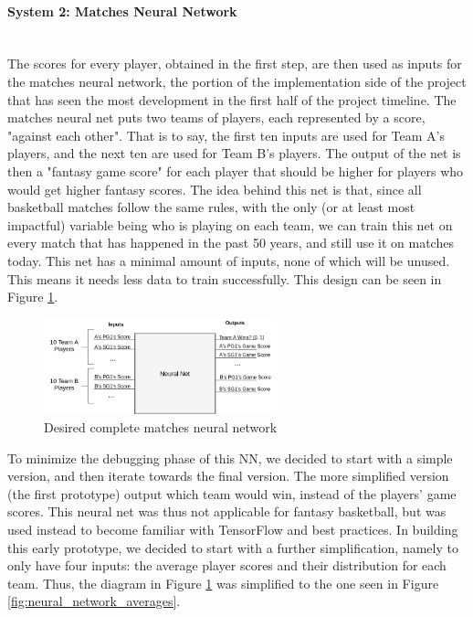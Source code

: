 \paragraph{System 2: Matches Neural Network}\mbox{}\\
The scores for every player, obtained in the first step, are then used as inputs for the matches neural network, the portion of the implementation side of the project that has seen the most development in the first half of the project timeline. The matches neural net puts two teams of players, each represented by a score, "against each other". That is to say, the first ten inputs are used for Team A's players, and the next ten are used for Team B's players.  The output of the net is then a "fantasy game score" for each player that should be higher for players who would get higher fantasy scores. The idea behind this net is that, since all basketball matches follow the same rules, with the only (or at least most impactful) variable being who is playing on each team, we can train this net on every match that has happened in the past 50 years, and still use it on matches today. This net has a minimal amount of inputs, none of which will be unused. This means it needs less data to train successfully. This design can be seen in Figure \ref{fig:neural_network_full}.

\begin{figure}[ht]
    \centering
    \includegraphics[width=0.6\textwidth]{figures/neural_network_full}
    \caption{Desired complete matches neural network}
    \label{fig:neural_network_full}
\end{figure}

To minimize the debugging phase of this NN, we decided to start with a simple version, and then iterate towards the final version. The more simplified version (the first prototype) output which team would win, instead of the players' game scores. This neural net was thus not applicable for fantasy basketball, but was used instead to become familiar with TensorFlow and best practices. In building this early prototype, we decided to start with a further simplification, namely to only have four inputs: the average player scores and their distribution for each team. Thus, the diagram in Figure \ref{fig:neural_network_full} was simplified to the one seen in Figure \ref{fig:neural_network_averages}.

